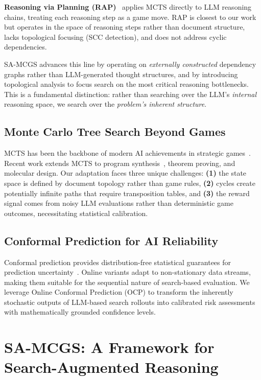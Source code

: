 \documentclass{article}
\begin{document}
\textbf{Reasoning via Planning (RAP)}~\cite{rap} applies MCTS directly to LLM reasoning chains, treating each reasoning step as a game move. RAP is closest to our work but operates in the space of reasoning steps rather than document structure, lacks topological focusing (SCC detection), and does not address cyclic dependencies.

SA-MCGS advances this line by operating on \emph{externally constructed} dependency graphs rather than LLM-generated thought structures, and by introducing topological analysis to focus search on the most critical reasoning bottlenecks. This is a fundamental distinction: rather than searching over the LLM's \emph{internal} reasoning space, we search over the \emph{problem's inherent structure}.

\subsection{Monte Carlo Tree Search Beyond Games}

MCTS has been the backbone of modern AI achievements in strategic games~\cite{mcts, alpha}. Recent work extends MCTS to program synthesis~\cite{alphacode}, theorem proving, and molecular design. Our adaptation faces three unique challenges: \textbf{(1)} the state space is defined by document topology rather than game rules, \textbf{(2)} cycles create potentially infinite paths that require transposition tables, and \textbf{(3)} the reward signal comes from noisy LLM evaluations rather than deterministic game outcomes, necessitating statistical calibration.

\subsection{Conformal Prediction for AI Reliability}

Conformal prediction provides distribution-free statistical guarantees for prediction uncertainty~\cite{conformal}. Online variants adapt to non-stationary data streams, making them suitable for the sequential nature of search-based evaluation. We leverage Online Conformal Prediction (OCP) to transform the inherently stochastic outputs of LLM-based search rollouts into calibrated risk assessments with mathematically grounded confidence levels.

\section{SA-MCGS: A Framework for Search-Augmented Reasoning}
\end{document}
